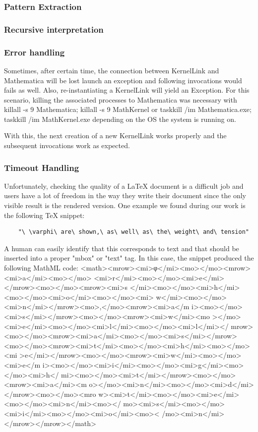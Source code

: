\subsubsection{Pattern Extraction}

\subsubsection{Recursive interpretation}

\subsubsection{Error handling}
Sometimes, after certain time, the connection between {\codefont KernelLink} and {\codefont Mathematica} will be lost launch an exception and following invocations would fails as well.
Also, re-instantiating a KernelLink will yield an Exception. For this scenario, killing the associated processes to Mathematica was necessary with {\codefont killall -s 9 Mathematica; killall -s 9 MathKernel
} or {\codefont taskkill /im Mathematica.exe; taskkill /im MathKernel.exe} depending on the OS the system is running on.

With this, the next creation of a new KernelLink works properly and the subsequent invocations work as expected.

\subsubsection{Timeout Handling}
Unfortunately, checking the quality of a LaTeX document is a difficult job and users have a lot of freedom in the way they write their document since the only visible result is the rendered version. 
One example we found during our work is the following TeX snippet:
\begin{verbatim}
	"\ \varphi\ are\ shown,\ as\ well\ as\ the\ weight\ and\ tension"
\end{verbatim}
A human can easily identify that this corresponds to text and that should be inserted into a proper "mbox" or "text" tag. In this case, the snippet produced the following MathML code:
\small{\codefont <math><mrow><mi>φ</mi><mo></mo><mrow><mi>a</mi><mo></mo>
<mi>r</mi><mo></mo><mi>e</mi></mrow><mo></mo><mrow><mi>s
</mi><mo></mo><mi>h</mi><mo></mo><mi>o</mi><mo></mo><mi>
w</mi><mo></mo><mi>n</mi></mrow><mo>,</mo><mrow><mi>a</m
i><mo></mo><mi>s</mi></mrow><mo></mo><mrow><mi>w</mi><mo
></mo><mi>e</mi><mo></mo><mi>l</mi><mo></mo><mi>l</mi></
mrow><mo></mo><mrow><mi>a</mi><mo></mo><mi>s</mi></mrow>
<mo></mo><mrow><mi>t</mi><mo></mo><mi>h</mi><mo></mo><mi
>e</mi></mrow><mo></mo><mrow><mi>w</mi><mo></mo><mi>e</m
i><mo></mo><mi>i</mi><mo></mo><mi>g</mi><mo></mo><mi>h</
mi><mo></mo><mi>t</mi></mrow><mo></mo><mrow><mi>a</mi><m
o></mo><mi>n</mi><mo></mo><mi>d</mi></mrow><mo></mo><mro
w><mi>t</mi><mo></mo><mi>e</mi><mo></mo><mi>n</mi><mo></
mo><mi>s</mi><mo></mo><mi>i</mi><mo></mo><mi>o</mi><mo><
/mo><mi>n</mi></mrow></mrow></math>
}

